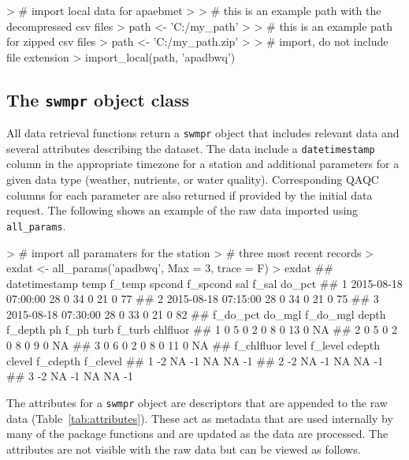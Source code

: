 \begin{example}
> # import local data for apaebmet
> 
> # this is an example path with the decompressed csv files
> path <- 'C:/my_path'
> 
> # this is an example path for zipped csv files
> path <- 'C:/my_path.zip'
> 
> # import, do not include file extension
> import_local(path, 'apadbwq') 
\end{example}

\subsection{The \texttt{swmpr} object class}

All data retrieval functions return a \texttt{swmpr} object that includes relevant data and several attributes describing the dataset.  The data include a \texttt{datetimestamp} column in the appropriate timezone for a station and additional parameters for a given data type (weather, nutrients, or water quality).  Corresponding QAQC columns for each parameter are also returned if provided by the initial data request.  The following shows an example of the raw data imported using \texttt{all\_params}.

\begin{example}
> # import all paramaters for the station
> # three most recent records
> exdat <- all_params('apadbwq', Max = 3, trace = F)
> exdat
##         datetimestamp temp f_temp spcond f_spcond sal f_sal do_pct
## 1 2015-08-18 07:00:00   28      0     34        0  21     0     77
## 2 2015-08-18 07:15:00   28      0     34        0  21     0     75
## 3 2015-08-18 07:30:00   28      0     33        0  21     0     82
##   f_do_pct do_mgl f_do_mgl depth f_depth ph f_ph turb f_turb chlfluor
## 1        0      5        0     2       0  8    0   13      0       NA
## 2        0      5        0     2       0  8    0    9      0       NA
## 3        0      6        0     2       0  8    0   11      0       NA
##   f_chlfluor level f_level cdepth clevel f_cdepth f_clevel
## 1         -2    NA      -1     NA     NA       -1         
## 2         -2    NA      -1     NA     NA       -1         
## 3         -2    NA      -1     NA     NA       -1
\end{example}

The attributes for a \texttt{swmpr} object are descriptors that are appended to the raw data (Table~\ref{tab:attributes}).  These act as metadata that are used internally by many of the package functions and are updated as the data are processed. The attributes are not visible with the raw data but can be viewed as follows.

